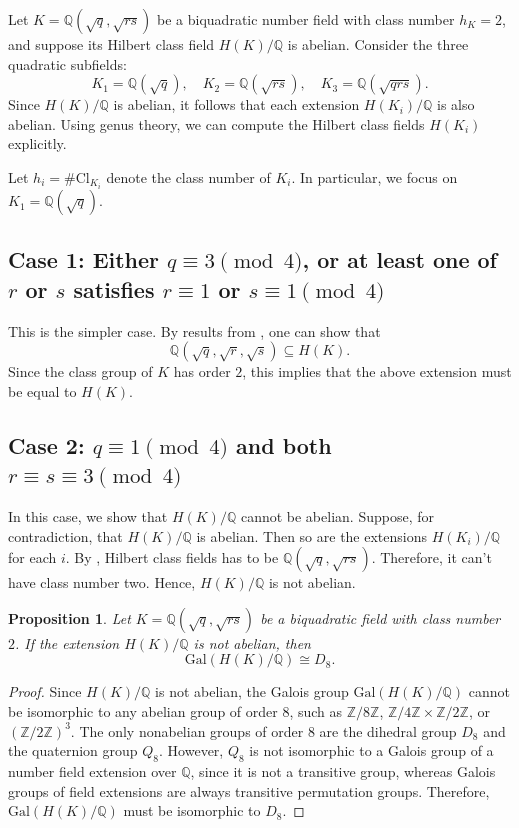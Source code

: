 \documentclass[12 pt]{amsart}
\newtheorem{prop}[thm]{Proposition}
\theoremstyle{definition}
\theoremstyle{remark}
\begin{document}
Let $K = \mathbb{Q}(\sqrt{q}, \sqrt{rs})$ be a biquadratic number field with class number $h_K = 2$, and suppose its Hilbert class field $H(K)/\mathbb{Q}$ is abelian. Consider the three quadratic subfields:
\[
K_1 = \mathbb{Q}(\sqrt{q}), \quad K_2 = \mathbb{Q}(\sqrt{rs}), \quad K_3 = \mathbb{Q}(\sqrt{qrs}).
\]
Since $H(K)/\mathbb{Q}$ is abelian, it follows that each extension $H(K_i)/\mathbb{Q}$ is also abelian. Using genus theory, we can compute the Hilbert class fields $H(K_i)$ explicitly.

Let $h_i = \#\mathrm{Cl}_{K_i}$ denote the class number of $K_i$. In particular, we focus on $K_1 = \mathbb{Q}(\sqrt{q})$.

\subsection*{Case 1: Either $q \equiv 3 \pmod{4}$, or at least one of $r$ or $s$ satisfies $r \equiv 1$ or $s \equiv 1 \pmod{4}$}

This is the simpler case. By results from \cite{KrPa25}, one can show that
\[
\mathbb{Q}(\sqrt{q}, \sqrt{r}, \sqrt{s}) \subseteq H(K).
\]
Since the class group of $K$ has order $2$, this implies that the above extension must be equal to $H(K)$.

\subsection*[Case 2: $q \equiv 1 \pmod{4}$ and both $r \equiv s \equiv 3 \pmod{4}$]{Case 2: $q \equiv 1 \pmod{4}$ and both $r \equiv s \equiv 3 \pmod{4}$}

In this case, we show that $H(K)/\mathbb{Q}$ cannot be abelian. Suppose, for contradiction, that $H(K)/\mathbb{Q}$ is abelian. Then so are the extensions $H(K_i)/\mathbb{Q}$ for each $i$.
By , Hilbert class fields has to be $\mathbb{Q}(\sqrt{q},\sqrt{rs})$. Therefore, it can't have class number two. 
Hence, $H(K)/\mathbb{Q}$ is not abelian.


\begin{prop}
Let $K = \mathbb{Q}(\sqrt{q}, \sqrt{rs})$ be a biquadratic field with class number $2$. If the extension $H(K)/\mathbb{Q}$ is not abelian, then
\[
\mathrm{Gal}(H(K)/\mathbb{Q}) \cong D_8.
\]
\end{prop}

\begin{proof}
Since $H(K)/\mathbb{Q}$ is not abelian, the Galois group $\mathrm{Gal}(H(K)/\mathbb{Q})$ cannot be isomorphic to any abelian group of order $8$, such as $\mathbb{Z}/8\mathbb{Z}$, $\mathbb{Z}/4\mathbb{Z} \times \mathbb{Z}/2\mathbb{Z}$, or $(\mathbb{Z}/2\mathbb{Z})^3$.
The only nonabelian groups of order $8$ are the dihedral group $D_8$ and the quaternion group $Q_8$. However, $Q_8$ is not isomorphic to a Galois group of a number field extension over $\mathbb{Q}$, since it is not a transitive group, whereas Galois groups of field extensions are always transitive permutation groups.  Therefore, $\mathrm{Gal}(H(K)/\mathbb{Q})$ must be isomorphic to $D_8$.
\end{proof}
\end{document}
